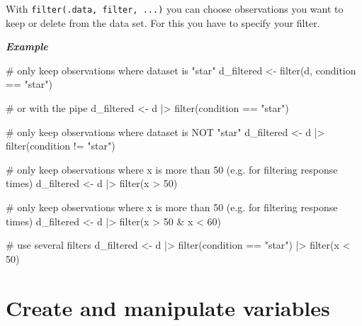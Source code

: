 \documentclass[
  letterpaper,
  DIV=11,
  numbers=noendperiod,
  oneside]{scrreprt}
\newenvironment{Shaded}{\begin{snugshade}}{\end{snugshade}}
\newcommand{\CommentTok}[1]{\textcolor[rgb]{0.37,0.37,0.37}{#1}}
\newcommand{\DecValTok}[1]{\textcolor[rgb]{0.68,0.00,0.00}{#1}}
\newcommand{\FunctionTok}[1]{\textcolor[rgb]{0.28,0.35,0.67}{#1}}
\newcommand{\NormalTok}[1]{\textcolor[rgb]{0.00,0.23,0.31}{#1}}
\newcommand{\OtherTok}[1]{\textcolor[rgb]{0.00,0.23,0.31}{#1}}
\newcommand{\SpecialCharTok}[1]{\textcolor[rgb]{0.37,0.37,0.37}{#1}}
\newcommand{\StringTok}[1]{\textcolor[rgb]{0.13,0.47,0.30}{#1}}
\begin{document}
With \texttt{filter(.data,\ filter,\ ...)} you can choose observations
you want to keep or delete from the data set. For this you have to
specify your filter.

\textbf{\emph{Example}}

\begin{Shaded}
\begin{Highlighting}[]
\CommentTok{\# only keep observations where dataset is "star"}
\NormalTok{d\_filtered }\OtherTok{\textless{}{-}} \FunctionTok{filter}\NormalTok{(d, condition }\SpecialCharTok{==} \StringTok{"star"}\NormalTok{)}

\CommentTok{\# or with the pipe}
\NormalTok{d\_filtered }\OtherTok{\textless{}{-}}\NormalTok{ d }\SpecialCharTok{|\textgreater{}} \FunctionTok{filter}\NormalTok{(condition }\SpecialCharTok{==} \StringTok{"star"}\NormalTok{)}

\CommentTok{\# only keep observations where dataset is NOT "star"}
\NormalTok{d\_filtered }\OtherTok{\textless{}{-}}\NormalTok{ d }\SpecialCharTok{|\textgreater{}} \FunctionTok{filter}\NormalTok{(condition }\SpecialCharTok{!=} \StringTok{"star"}\NormalTok{)}

\CommentTok{\# only keep observations where x is more than 50 (e.g. for filtering response times)}
\NormalTok{d\_filtered }\OtherTok{\textless{}{-}}\NormalTok{ d }\SpecialCharTok{|\textgreater{}} \FunctionTok{filter}\NormalTok{(x }\SpecialCharTok{\textgreater{}} \DecValTok{50}\NormalTok{)}

\CommentTok{\# only keep observations where x is more than 50 (e.g. for filtering response times)}
\NormalTok{d\_filtered }\OtherTok{\textless{}{-}}\NormalTok{ d }\SpecialCharTok{|\textgreater{}} \FunctionTok{filter}\NormalTok{(x }\SpecialCharTok{\textgreater{}} \DecValTok{50} \SpecialCharTok{\&}\NormalTok{ x }\SpecialCharTok{\textless{}} \DecValTok{60}\NormalTok{)}

\CommentTok{\# use several filters}
\NormalTok{d\_filtered }\OtherTok{\textless{}{-}}\NormalTok{ d }\SpecialCharTok{|\textgreater{}} 
    \FunctionTok{filter}\NormalTok{(condition }\SpecialCharTok{==} \StringTok{"star"}\NormalTok{) }\SpecialCharTok{|\textgreater{}}
    \FunctionTok{filter}\NormalTok{(x }\SpecialCharTok{\textless{}} \DecValTok{50}\NormalTok{)}
\end{Highlighting}
\end{Shaded}

\hypertarget{create-and-manipulate-variables}{%
\section{Create and manipulate
variables}\label{create-and-manipulate-variables}}
\end{document}

